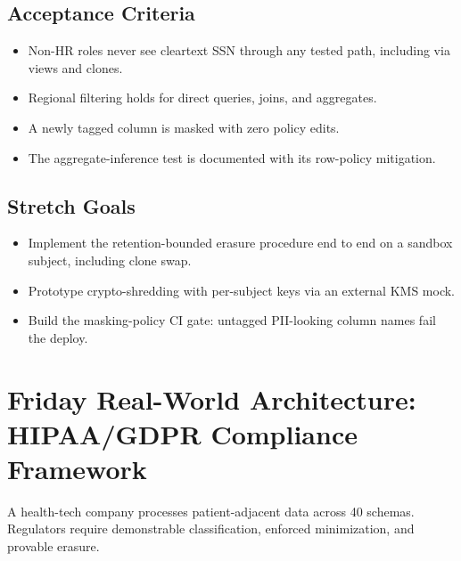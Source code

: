 \subsection*{Acceptance Criteria}
\begin{itemize}
    \item Non-HR roles never see cleartext SSN through any tested path, including via views and clones.
    \item Regional filtering holds for direct queries, joins, and aggregates.
    \item A newly tagged column is masked with zero policy edits.
    \item The aggregate-inference test is documented with its row-policy mitigation.
\end{itemize}

\subsection*{Stretch Goals}
\begin{itemize}
    \item Implement the retention-bounded erasure procedure end to end on a sandbox subject, including clone swap.
    \item Prototype crypto-shredding with per-subject keys via an external KMS mock.
    \item Build the masking-policy CI gate: untagged PII-looking column names fail the deploy.
\end{itemize}

\section{Friday Real-World Architecture: HIPAA/GDPR Compliance Framework}
A health-tech company processes patient-adjacent data across 40 schemas. Regulators require demonstrable classification, enforced minimization, and provable erasure.

